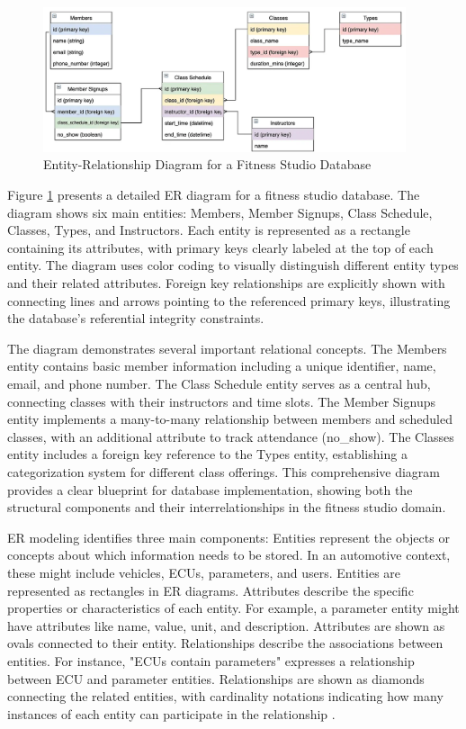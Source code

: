 \begin{figure}[ht]
    \centering
    \includegraphics[width=0.95\textwidth]{figures/er_diagram.png}
    \caption{Entity-Relationship Diagram for a Fitness Studio Database}
    \label{fig:er-diagram}
\end{figure}

Figure \ref{fig:er-diagram} presents a detailed \ac{ER} diagram for a fitness studio database. The diagram shows six main entities: Members, Member Signups, Class Schedule, Classes, Types, and Instructors. Each entity is represented as a rectangle containing its attributes, with primary keys clearly labeled at the top of each entity. The diagram uses color coding to visually distinguish different entity types and their related attributes. Foreign key relationships are explicitly shown with connecting lines and arrows pointing to the referenced primary keys, illustrating the database's referential integrity constraints.

The diagram demonstrates several important relational concepts. The Members entity contains basic member information including a unique identifier, name, email, and phone number. The Class Schedule entity serves as a central hub, connecting classes with their instructors and time slots. The Member Signups entity implements a many-to-many relationship between members and scheduled classes, with an additional attribute to track attendance (no\_show). The Classes entity includes a foreign key reference to the Types entity, establishing a categorization system for different class offerings. This comprehensive diagram provides a clear blueprint for database implementation, showing both the structural components and their interrelationships in the fitness studio domain.

\ac{ER} modeling identifies three main components: Entities represent the objects or concepts about which information needs to be stored. In an automotive context, these might include vehicles, \acp{ECU}, parameters, and users. Entities are represented as rectangles in \ac{ER} diagrams. Attributes describe the specific properties or characteristics of each entity. For example, a parameter entity might have attributes like name, value, unit, and description. Attributes are shown as ovals connected to their entity. Relationships describe the associations between entities. For instance, "\acp{ECU} contain parameters" expresses a relationship between \ac{ECU} and parameter entities. Relationships are shown as diamonds connecting the related entities, with cardinality notations indicating how many instances of each entity can participate in the relationship \cite{elmasri2015fundamentals}.


